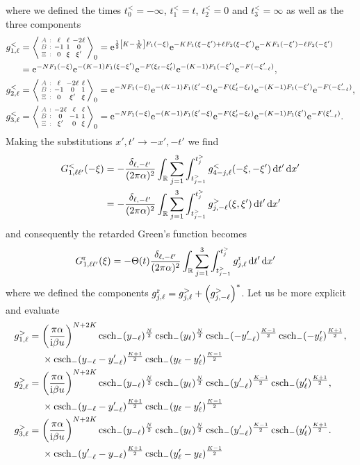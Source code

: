 \documentclass[english, parskip=full]{scrartcl}
\begin{document}
where we defined the times $t_0^< = -\infty$, $t_1^< = t$, $t_2^< = 0$ and $t_3^< = \infty$ as well as the three components
\begin{align}
g_{1,\ell}^< &= \bra*{\cabx{\ell&\ell&-2\ell}{-1&1&0}{0&\xi&\xi'}}_0 = \powe{\frac{1}{2} \klb*{K - \frac{1}{K}}F_1(-\xi)} \powe{-KF_1(\xi-\xi') + \ell F_2(\xi-\xi')} \powe{-KF_1(-\xi') - \ell F_2(-\xi')} \\
&= \powe{-NF_1(-\xi)} \powe{-(K-1)F_1(\xi-\xi')} \powe{-F(\xi_{\ell} - \xi_{\ell}')} \powe{-(K-1)F_1(-\xi')} \powe{-F(-\xi_{-\ell}')},\\
g_{2,\ell}^< &= \bra*{\cabx{\ell&-2\ell&\ell}{-1&0&1}{0&\xi'&\xi}}_0 = \powe{-NF_1(-\xi)} \powe{-(K-1)F_1(\xi'-\xi)} \powe{-F(\xi_{\ell}' - \xi_{\ell})} \powe{-(K-1)F_1(-\xi')} \powe{-F(-\xi_{-\ell}')},\\
g_{3,\ell}^< &= \bra*{\cabx{-2\ell&\ell&\ell}{0&-1&1}{\xi'&0&\xi}}_0 = \powe{-NF_1(-\xi)} \powe{-(K-1)F_1(\xi'-\xi)} \powe{-F(\xi_{\ell}' - \xi_{\ell})} \powe{-(K-1)F_1(\xi')} \powe{-F(\xi_{-\ell}')}.
\end{align}
Making the substitutions $x',t'\rightarrow -x',-t'$ we find
\begin{align}
G_{1,\ell\ell'}^<(-\xi) &= -\frac{\delta_{\ell,-\ell'}}{(2\pi\alpha)^2} \intr{ \sum_{j=1}^3 \intx{t_{j-1}^>}{t_j^>}{g_{4-j,\ell}^<(-\xi,-\xi')}{t'} }{x'}\\
&= -\frac{\delta_{\ell,-\ell'}}{(2\pi\alpha)^2} \intr{ \sum_{j=1}^3 \intx{t_{j-1}^>}{t_j^>}{g_{j,-\ell}^>(\xi,\xi')}{t'} }{x'}
\end{align}
and consequently the retarded Green's function becomes
\begin{align}
G_{1,\ell\ell'}^\r(\xi) &= -\Theta(t) \frac{\delta_{\ell,-\ell'}}{(2\pi\alpha)^2} \intr{\sum_{j=1}^3 \intx{t_{j-1}^>}{t_j^>}{ g_{j,\ell}^\r }{t'} }{x'}
\end{align}
where we defined the components $g_{j,\ell}^\r = g_{j,\ell}^> + \kla*{g_{j,-\ell}^>}^\ast$.
Let us be more explicit and evaluate
\begin{align}
g_{1,\ell}^> &= \bsplit{&\kla*{\frac{\pi\alpha}{\i\beta u}}^{N+2K} \csch_-(y_{-\ell})^\frac{N}{2} \csch_-(y_\ell)^\frac{N}{2} \csch_-(-y_{-\ell}')^\frac{K-1}{2} \csch_-(-y_\ell')^\frac{K+1}{2} \\
&\times \csch_-(y_{-\ell}-y_{-\ell}')^\frac{K+1}{2} \csch_-(y_\ell-y_\ell')^\frac{K-1}{2}},\\
g_{2,\ell}^> &= \bsplit{&\kla*{\frac{\pi\alpha}{\i\beta u}}^{N+2K} \csch_-(y_{-\ell})^\frac{N}{2} \csch_-(y_\ell)^\frac{N}{2} \csch_-(y_{-\ell}')^\frac{K-1}{2} \csch_-(y_\ell')^\frac{K+1}{2} \\
&\times \csch_-(y_{-\ell}-y_{-\ell}')^\frac{K+1}{2} \csch_-(y_\ell-y_\ell')^\frac{K-1}{2}},\\
g_{3,\ell}^> &= \bsplit{&\kla*{\frac{\pi\alpha}{\i\beta u}}^{N+2K} \csch_-(y_{-\ell})^\frac{N}{2} \csch_-(y_\ell)^\frac{N}{2} \csch_-(y_{-\ell}')^\frac{K-1}{2} \csch_-(y_\ell')^\frac{K+1}{2} \\
&\times \csch_-(y_{-\ell}'-y_{-\ell})^\frac{K+1}{2} \csch_-(y_\ell'-y_\ell)^\frac{K-1}{2}}.
\end{align}
\end{document}
